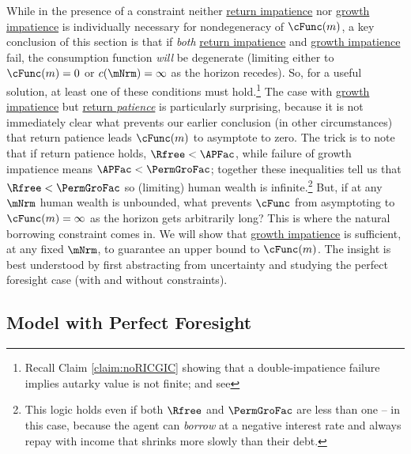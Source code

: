 \documentclass[BufferStockTheory]{subfiles}
\begin{document}
While in the presence of a constraint neither \hyperlink{RIC}{return impatience} nor \hyperlink{GIC}{growth impatience} is individually necessary for nondegeneracy of $\cFunc(m)$, a key conclusion of this section is that if \emph{both} \hyperlink{RIC}{return impatience} and \hyperlink{GIC}{growth impatience} fail, the consumption function \emph{will} be degenerate (limiting either to $\cFunc(m)=0$ or $c(\mNrm)=\infty$ as the horizon recedes).
So, for a useful solution, at least one of these conditions must hold.\footnote{Recall Claim \ref{claim:noRICGIC} showing that a double-impatience failure implies autarky value is not finite; and see } The case with \hyperlink{GIC}{growth impatience} but \hyperlink{RIC}{return \emph{patience}} is particularly surprising, because it is not immediately clear what prevents our earlier conclusion (in other circumstances) that return patience leads $\cFunc(m)$ to asymptote to zero.
The trick is to note that if return patience holds, $\Rfree < \APFac$, while failure of growth impatience means $\APFac < \PermGroFac$; together these inequalities tell us that $\Rfree < \PermGroFac$ so (limiting) human wealth is infinite.\footnote{This logic holds even if both $\Rfree$ and $\PermGroFac$ are less than one -- in this case, because the agent can \emph{borrow} at a negative interest rate and always repay with income that shrinks more slowly than their debt.}
But, if at any $\mNrm$ human wealth is unbounded, what prevents $\cFunc$ from asymptoting to $\cFunc(m)=\infty$ as the horizon gets arbitrarily long?
This is where the natural borrowing constraint comes in.
We will show that \hyperlink{GIC}{growth impatience} is sufficient, at any fixed $\mNrm$, to guarantee an upper bound to $\cFunc(m)$.
The insight is best understood by first abstracting from uncertainty and studying the perfect foresight case (with and without constraints).

\subsection{Model with Perfect Foresight}\label{subsec:PFBdiscussion}

\hypertarget{ValuePFAnalytical}{}
\hypertarget{Autarky-Value-PF}{}

\end{document}
